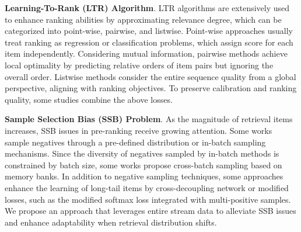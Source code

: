 \textbf{Learning-To-Rank (LTR) Algorithm}.
LTR algorithms are extensively used to enhance ranking abilities by approximating relevance degree, which can be categorized into point-wise, pairwise, and listwise.
Point-wise\cite{1994inferring} approaches usually treat ranking as regression or classification problems, which assign score for each item independently.
Considering mutual information, pairwise\cite{2005RankNet,2015RankingSVM} methods achieve local optimality by predicting relative orders of item pairs but ignoring the overall order.
Listwise methods\cite{2007onlylist,2008listmle1,2010lambdarank} consider the entire sequence quality from a global perspective, aligning with ranking objectives.
To preserve calibration and ranking quality, some studies combine the above losses\cite{2022point_mix2,2023joint_rank_cali}.

\textbf{Sample Selection Bias (SSB) Problem}.
As the magnitude of retrieval items increases, SSB issues\cite{2004ssb} in pre-ranking receive growing attention.
Some works sample negatives through a pre-defined distribution\cite{2013_global_neg} or in-batch sampling mechanisms\cite{2019LDRER,2020_negative_gold}.
Since the diversity of negatives sampled by in-batch methods is constrained by batch size, some works propose cross-batch sampling based on memory banks\cite{2020cross_cvpr,2021_cross_batch}.
In addition to negative sampling techniques, some approaches enhance the learning of long-tail items by cross-decoupling network\cite{2023ELIRCDN} or modified losses, such as the modified softmax loss integrated with multi-positive samples\cite{2023GCL_MOPPR}.
We propose an approach that leverages entire stream data to alleviate SSB issues and enhance adaptability when retrieval distribution shifts.

\vspace{-1mm}
